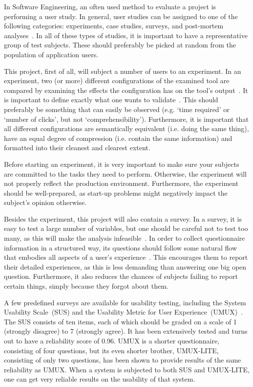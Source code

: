 In Software Engineering, an often used method to evaluate a project is performing a user study. In general, user studies can be assigned to one of the following categories: experiments, case studies, surveys, and post-mortem analyses~\cite{wohlin2003empirical}. In all of these types of studies, it is important to have a representative group of test subjects. These should preferably be picked at random from the population of application users.

This project, first of all, will subject a number of users to an experiment. In an experiment, two (or more) different configurations of the examined tool are compared by examining the effects the configuration has on the tool's output~\cite{wohlin2003empirical}. It is important to define exactly what one wants to validate~\cite{stein2009assessing}. This should preferably be something that can easily be observed (e.g. `time required' or `number of clicks', but not `comprehensibility'). Furthermore, it is important that all different configurations are semantically equivalent (i.e. doing the same thing), have an equal degree of compression (i.e. contain the same information) and formatted into their cleanest and clearest extent.

Before starting an experiment, it is very important to make sure your subjects are committed to the tasks they need to perform. Otherwise, the experiment will not properly reflect the production environment. Furthermore, the experiment should be well-prepared, as start-up problems might negatively impact the subject's opinion otherwise.

Besides the experiment, this project will also contain a survey. In a survey, it is easy to test a large number of variables, but one should be careful not to test too many, as this will make the analysis infeasible~\cite{wohlin2003empirical}. In order to collect questionnaire information in a structured way, its questions should follow some natural flow that embodies all aspects of a user's experience~\cite{tuch2013analyzing}. This encourages them to report their detailed experiences, as this is less demanding than answering one big open question. Furthermore, it also reduces the chances of subjects failing to report certain things, simply because they forgot about them.

A few predefined surveys are available for usability testing, including the System Usability Scale~(SUS) and the Usability Metric for User Experience~(UMUX)~\cite{lewis2013umux}. The SUS consists of ten items, each of which should be graded on a scale of 1 (strongly disagree) to 7 (strongly agree). It has been extensively tested and turns out to have a reliability score of 0.96. UMUX is a shorter questionnaire, consisting of four questions, but its even shorter brother, UMUX-LITE, consisting of only two questions, has been shown to provide results of the same reliability as UMUX. When a system is subjected to both SUS and UMUX-LITE, one can get very reliable results on the usability of that system.

